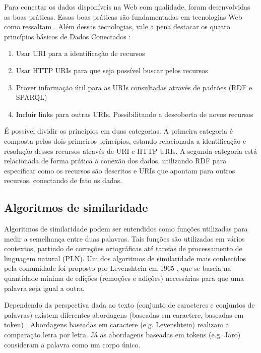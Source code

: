 Para conectar os dados disponíveis na Web com qualidade, foram desenvolvidas as boas práticas. Essas boas práticas são fundamentadas em tecnologias Web como ressaltam . Além dessas tecnologias, vale a pena destacar os quatro princípios básicos de Dados Conectados \cite{berners2006linked}: 

\begin{enumerate}
	\item Usar URI para a identificação de recursos
	\item Usar HTTP URIs para que seja possível buscar pelos recursos 
	\item Prover informação útil para as URIs consultadas através de padrões (RDF e SPARQL) 
	\item Incluir links para outras URIs. Possibilitando a descoberta de novos recursos
\end{enumerate}

É possível dividir os princípios em duas categorias. A primeira categoria é composta pelos dois primeiros princípios, estando relacionada a identificação e resolução desses recursos através de URI e HTTP URIs. A segunda categoria está relacionada de forma prática à conexão dos dados, utilizando RDF para especificar como os recursos são descritos e URIs que apontam para outros recursos, conectando de fato os dados.

\subsection{Algoritmos de similaridade}

Algoritmos de similaridade podem ser entendidos como funções utilizadas para medir a semelhança entre duas palavras. Tais funções são utilizadas em vários contextos, partindo de correções ortográficas até tarefas de processamento de linguagem natural (PLN). Um dos algoritmos de similaridade mais conhecidos pela comunidade foi proposto por Levenshtein em 1965 \cite{levenshtein1966binary}, que se baseia na quantidade mínima de edições (remoções e adições) necessárias para que uma palavra seja igual a outra.  

Dependendo da perspectiva dada ao texto (conjunto de caracteres e conjuntos de palavras) existem diferentes abordagens (baseadas em caractere, baseadas em token) \cite{cohen2003comparison}. Abordagens baseadas em caractere (e.g. Levenshtein) realizam a comparação letra por letra. Já as abordagens baseadas em tokens (e.g. Jaro)  consideram a palavra como um corpo único.

